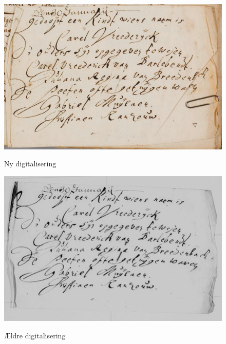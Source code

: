 \documentclass[
	a4paper,
	12pt,
	final
]{memoir}
\begin{document}
\begin{figure}[H]%
	\centerfloat%
	\includegraphics[width=\textwidth]{seddel.png}\\%
	\caption{Ny digitalisering}%
\end{figure}%
\begin{figure}[H]%
	\centerfloat%
	\includegraphics[width=.7\textwidth]{kb-old.png}\\%
	\caption{Ældre digitalisering}%
\end{figure}%
\end{document}
